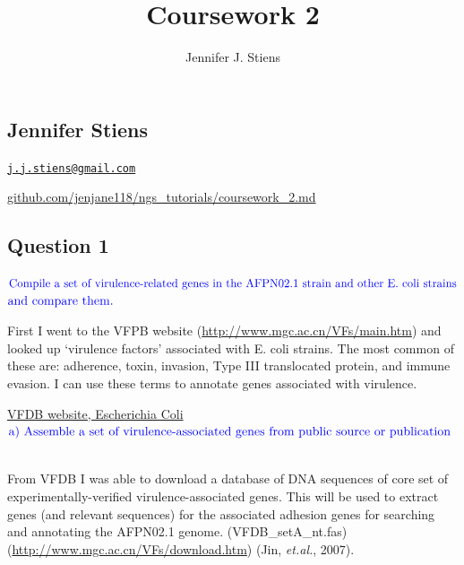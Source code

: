 \documentclass[12pt,]{article}
\title{Coursework 2}
\author{Jennifer J. Stiens}
\date{}
\begin{document}
\maketitle

\subsection{Jennifer Stiens}\label{jennifer-stiens}

\href{mailto:j.j.stiens@gmail.com}{\nolinkurl{j.j.stiens@gmail.com}}

\href{https://github.com/jenjane118/ngs_tutorials}{github.com/jenjane118/ngs\_tutorials/coursework\_2.md}

\subsection{Question 1}\label{question-1}

\(\color{blue}{\text{Compile a set of virulence-related genes in the AFPN02.1 strain and other E. coli strains}}\)
\(\color{blue}{\text{and compare them.}}\)

First I went to the VFPB website
(\url{http://www.mgc.ac.cn/VFs/main.htm}) and looked up `virulence
factors' associated with E. coli strains. The most common of these are:
adherence, toxin, invasion, Type III translocated protein, and immune
evasion. I can use these terms to annotate genes associated with
virulence.

\href{http://www.mgc.ac.cn/cgi-bin/VFs/genus.cgi?Genus=Escherichia}{VFDB
website, Escherichia
Coli}\\[2\baselineskip]\(\color{blue}{\text{a) Assemble a set of virulence-associated genes from public source or publication}}\)
~

From VFDB I was able to download a database of DNA sequences of core set
of experimentally-verified virulence-associated genes. This will be used
to extract genes (and relevant sequences) for the associated adhesion
genes for searching and annotating the AFPN02.1 genome.
(VFDB\_setA\_nt.fas) (\url{http://www.mgc.ac.cn/VFs/download.htm}) (Jin,
\emph{et.al.}, 2007).
\end{document}
